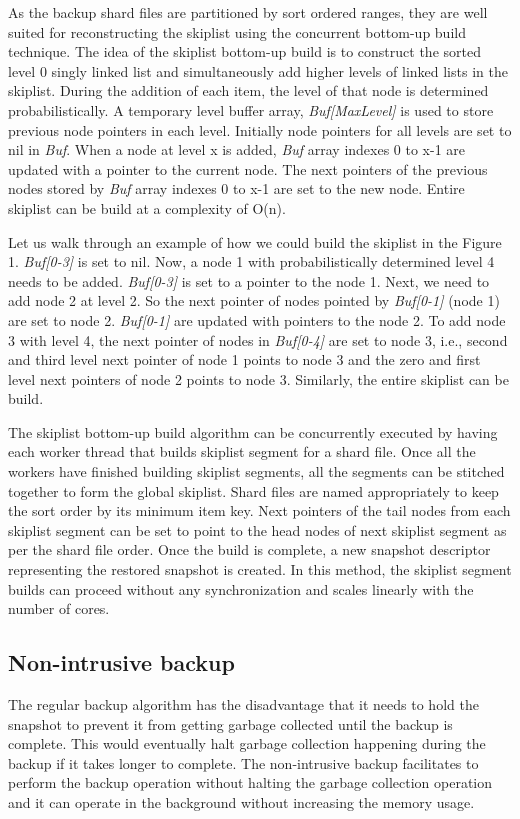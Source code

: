 \documentclass{vldb}
\begin{document}
As the backup shard files are partitioned by sort ordered ranges, they are well suited for reconstructing the skiplist using the concurrent bottom-up build technique. The idea of the skiplist bottom-up build is to construct the sorted level 0 singly linked list and simultaneously add higher levels of linked lists in the skiplist. During the addition of each item, the level of that node is determined probabilistically. A temporary level buffer array, \textit{Buf[MaxLevel]} is used to store previous node pointers in each level. Initially node pointers for all levels are set to nil in \textit{Buf}. When a node at level x is added, \textit{Buf} array indexes 0 to x-1 are updated with a pointer to the current node. The next pointers of the previous nodes stored by \textit{Buf} array indexes 0 to x-1 are set to the new node. Entire skiplist can be build at a complexity of O(n).

Let us walk through an example of how we could build the skiplist in the Figure 1. \textit{Buf[0-3]} is set to nil. Now, a node 1 with probabilistically determined level 4 needs to be added. \textit{Buf[0-3]} is set to a pointer to the node 1. Next, we need to add node 2 at level 2. So the next pointer of nodes pointed by \textit{Buf[0-1]} (node 1) are set to node 2. \textit{Buf[0-1]} are updated with pointers to the node 2. To add node 3 with level 4, the next pointer of nodes in \textit{Buf[0-4]} are set to node 3, i.e., second and third level next pointer of node 1 points to node 3 and the zero and first level next pointers of node 2 points to node 3. Similarly, the entire skiplist can be build.

 The skiplist bottom-up build algorithm can be concurrently executed by having each worker thread that builds skiplist segment for a shard file. Once all the workers have finished building skiplist segments, all the segments can be stitched together to form the global skiplist. Shard files are named appropriately to keep the sort order by its minimum item key. Next pointers of the tail nodes from each skiplist segment can be set to point to the head nodes of next skiplist segment as per the shard file order. Once the build is complete, a new snapshot descriptor representing the restored snapshot is created. In this method, the skiplist segment builds can proceed without any synchronization and scales linearly with the number of cores.


\subsection{Non-intrusive backup}
The regular backup algorithm has the disadvantage that it needs to hold the snapshot to prevent it from getting garbage collected until the backup is complete. This would eventually halt garbage collection happening during the backup if it takes longer to complete. The non-intrusive backup facilitates to perform the backup operation without halting the garbage collection operation and it can operate in the background without increasing the memory usage.
\end{document}

